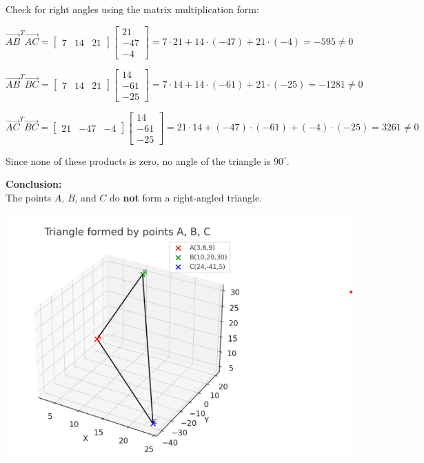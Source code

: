 \documentclass[journal]{IEEEtran}
\begin{document}
Check for right angles using the matrix multiplication form:

$$
\vec{AB}^T \vec{AC} 
= \begin{bmatrix}7 & 14 & 21\end{bmatrix}
  \begin{bmatrix}21\\-47\\-4\end{bmatrix}
= 7\cdot21 + 14\cdot(-47) + 21\cdot(-4) = -595 \neq 0
$$

$$
\vec{AB}^T \vec{BC} 
= \begin{bmatrix}7 & 14 & 21\end{bmatrix}
  \begin{bmatrix}14\\-61\\-25\end{bmatrix}
= 7\cdot14 + 14\cdot(-61) + 21\cdot(-25) = -1281 \neq 0
$$

$$
\vec{AC}^T \vec{BC} 
= \begin{bmatrix}21 & -47 & -4\end{bmatrix}
  \begin{bmatrix}14\\-61\\-25\end{bmatrix}
= 21\cdot14 + (-47)\cdot(-61) + (-4)\cdot(-25) = 3261 \neq 0
$$

Since none of these products is zero, no angle of the triangle is $90^\circ$.

\bigskip

\textbf{Conclusion:} \\
The points $A$, $B$, and $C$ do \textbf{not} form a right-angled triangle.
\begin{center}
    \includegraphics[width=0.8\columnwidth]{figs/plot3.png}
\end{center}
\end{document}
